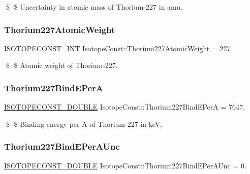 \$ \$ Uncertainty in atomic mass of Thorium-\/227 in amu. \mbox{\label{group___isotope_const-_thorium-_th227_ga7a2387d0a7bef1b03ce301c4fc37d037}} 
\subsubsection{\texorpdfstring{Thorium227\+Atomic\+Weight}{Thorium227AtomicWeight}}
{\footnotesize\ttfamily \mbox{\hyperlink{group___isotope_const-_macros_ga5f18360b3e99483a35c32d789e62621c}{I\+S\+O\+T\+O\+P\+E\+C\+O\+N\+S\+T\+\_\+\+I\+NT}} Isotope\+Const\+::\+Thorium227\+Atomic\+Weight = 227}

\$ \$ Atomic weight of Thorium-\/227. \mbox{\label{group___isotope_const-_thorium-_th227_gad0a5d7f6dcbf8f024ee1d65cd8ba14da}} 
\subsubsection{\texorpdfstring{Thorium227\+Bind\+E\+PerA}{Thorium227BindEPerA}}
{\footnotesize\ttfamily \mbox{\hyperlink{group___isotope_const-_macros_ga8f45a7272ce02c0b4c65c44636ed719a}{I\+S\+O\+T\+O\+P\+E\+C\+O\+N\+S\+T\+\_\+\+D\+O\+U\+B\+LE}} Isotope\+Const\+::\+Thorium227\+Bind\+E\+PerA = 7647.}

\$ \$ Binding energy per A of Thorium-\/227 in keV. \mbox{\label{group___isotope_const-_thorium-_th227_gac4fb0456f770149848bd04f93e6b419b}} 
\subsubsection{\texorpdfstring{Thorium227\+Bind\+E\+Per\+A\+Unc}{Thorium227BindEPerAUnc}}
{\footnotesize\ttfamily \mbox{\hyperlink{group___isotope_const-_macros_ga8f45a7272ce02c0b4c65c44636ed719a}{I\+S\+O\+T\+O\+P\+E\+C\+O\+N\+S\+T\+\_\+\+D\+O\+U\+B\+LE}} Isotope\+Const\+::\+Thorium227\+Bind\+E\+Per\+A\+Unc = 0.}


